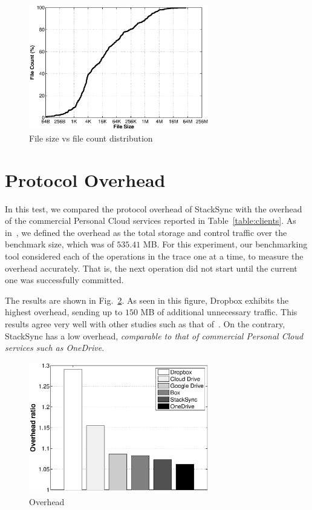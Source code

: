 \begin{figure}[t]
  \centering
  \label{fig:cdf_files}
  \includegraphics[width=0.7\textwidth]{figures/cdf_files}
  \vspace{-5pt}
  \caption{File size vs file count distribution}
\end{figure}

\section{Protocol Overhead}
In this test, we compared the protocol overhead of StackSync with the overhead of the
commercial Personal Cloud services reported in Table~\ref{table:clients}. As in~\cite{drago2013benchmarking},
we defined the overhead as the total storage and control traffic over the benchmark size, which was of 
$535.41$ MB. For this experiment, our benchmarking tool considered each of the operations in the trace one at a time,
to measure the overhead accurately. That is, the next operation did not start until the current one was
successfully committed.

The results are shown in Fig.~\ref{fig:overhead_clients}. As seen in this
figure, Dropbox exhibits the highest overhead, sending up to $150$ MB of additional
unnecessary traffic. This results agree very well with other studies such as that
of~\cite{li13}. On the contrary, StackSync has a low overhead, \textit{comparable to that of commercial
Personal Cloud services such as OneDrive}.

\begin{figure}[t]
  \centering
  \label{fig:overhead_clients}
  \includegraphics[width=0.7\textwidth]{figures/overhead_clients}
  \caption{Overhead}
  \vspace{-5pt}
\end{figure}


